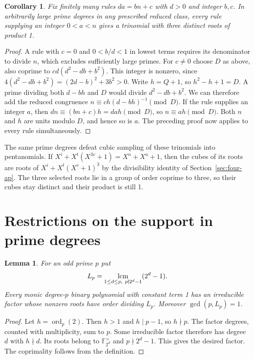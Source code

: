 \documentclass[11pt]{article}
\newtheorem{lemma}[theorem]{Lemma}
\newtheorem{corollary}[theorem]{Corollary}
\newcommand{\ord}{\operatorname{ord}}
\begin{document}
\begin{corollary}\label{cor:affine-tap-triples}
Fix finitely many rules \(d a=b n+c\) with \(d>0\) and integer
\(b,c\). In arbitrarily large prime degrees in any prescribed reduced
class, every rule supplying an integer \(0<a<n\) gives a trinomial
with three distinct roots of product 1.
\end{corollary}
\begin{proof}
A rule with \(c=0\) and \(0<b/d<1\) in lowest terms requires its
denominator to divide \(n\), which excludes sufficiently large primes.
For \(c\ne0\) choose \(D\) as above, also coprime to
\(cd(d^2-db+b^2)\). This integer is nonzero, since
\(4(d^2-db+b^2)=(2d-b)^2+3b^2>0\).
Write \(h=Q+1\), so \(h^2-h+1=D\). A prime dividing both
\(d-bh\) and \(D\) would divide \(d^2-db+b^2\). We can therefore add
the reduced congruence \(n\equiv ch(d-bh)^{-1}\pmod D\).
If the rule supplies an integer \(a\), then
\(dn\equiv (bn+c)h=dah\pmod D\), so \(n\equiv ah\pmod D\).
Both \(n\) and \(h\) are units modulo \(D\), and hence so is \(a\).
The preceding proof now applies to every rule simultaneously.
\end{proof}

The same prime degrees defeat cubic sampling of these trinomials into
pentanomials. If \(X^i+X^t(X^{3v}+1)=X^n+X^a+1\), then the cubes
of its roots are roots of \(X^i+X^t(X^v+1)^3\) by the divisibility
identity of Section~\ref{sec:four-ap}. The three selected roots lie in
a group of order coprime to three, so their cubes stay distinct and
their product is still 1.

\section{Restrictions on the support in prime degrees}
\begin{lemma}\label{lem:prime-period}
For an odd prime \(p\) put
\[
 L_p=\mathop{\rm lcm}_{1\le d\le p,\ p\nmid 2^d-1}(2^d-1).
\]
Every monic degree-\(p\) binary polynomial with constant term 1 has an
irreducible factor whose nonzero roots have order dividing \(L_p\).
Moreover \(\gcd(p,L_p)=1\).
\end{lemma}
\begin{proof}
Let \(h=\ord_p(2)\). Then \(h>1\) and \(h\mid p-1\), so \(h\nmid p\).
The factor degrees, counted with multiplicity, sum to \(p\). Some
irreducible factor therefore has degree \(d\) with \(h\nmid d\).
Its roots belong to \(\mathbb F_{2^d}^{\times}\) and \(p\nmid 2^d-1\).
This gives the desired factor. The coprimality follows from the definition.
\end{proof}
\end{document}
